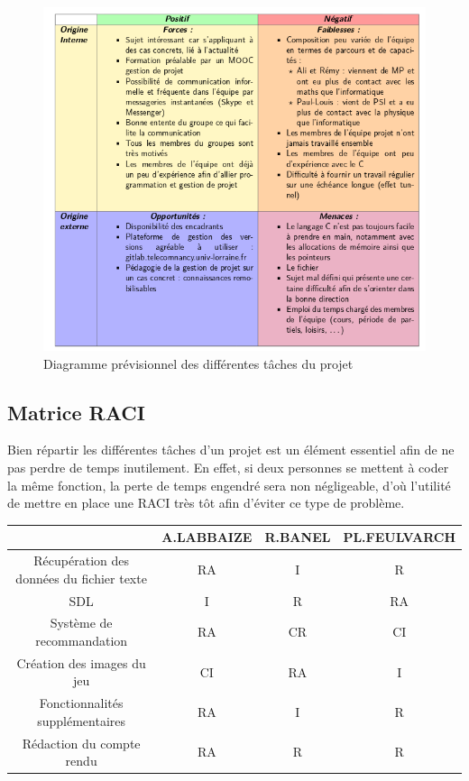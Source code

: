 \documentclass[light]{ceri}
\begin{document}
\begin{figure}[H]
\centering\includegraphics[width=18cm]{images/SWOT.png}
\caption{Diagramme prévisionnel des différentes tâches du projet}
\end{figure}  

\subsection{Matrice RACI}
Bien répartir les différentes tâches d'un projet est un élément essentiel afin de ne pas perdre de temps inutilement. En effet, si deux personnes se mettent à coder la même fonction, la perte de temps engendré sera non négligeable, d'où l'utilité de mettre en place une RACI très tôt afin d'éviter ce type de problème.

\begin{center}
\begin{tabular} {|c|c|c|c|}
\hline {}& {A.LABBAIZE} & {R.BANEL} & {PL.FEULVARCH} \\
\hline {Récupération des données du fichier texte} & {RA} & {I} & {R} \\
\hline {SDL} & {I} & {R} & {RA} \\
\hline {Système de recommandation} & {RA} & {CR} & {CI} \\
\hline {Création des images du jeu} & {CI} & {RA} & {I} \\
\hline {Fonctionnalités supplémentaires} & {RA} & {I} & {R} \\
\hline {Rédaction du compte rendu} & {RA} & {R} & {R} \\
\hline
\end{tabular}
\end{center}
\end{document}
